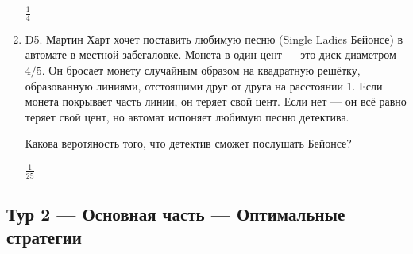 \documentclass[12pt]{article}
\newenvironment{problem}{}{}
\newenvironment{sol}{}{} %
\begin{document}
\begin{enumerate}
\begin{problem}
\begin{sol}
$\frac{1}{4}$
\end{sol}
\end{problem}

\begin{problem}
\item[D5.] Мартин Харт хочет поставить любимую песню (Single Ladies Бейонсе) в автомате в местной забегаловке. Монета в один цент — это диск диаметром $4/5$. Он бросает монету случайным образом на квадратную решётку, образованную линиями, отстоящими друг от друга на расстоянии 1. Если монета покрывает часть линии, он теряет свой цент. Если нет — он всё равно теряет свой цент, но автомат испоняет любимую песню детектива.

Какова веротяность того, что детектив сможет послушать Бейонсе?

\begin{sol}
$\frac{1}{25}$
\end{sol}
\end{problem}




\end{enumerate}


\newpage
\subsection{Тур 2 — Основная часть — Оптимальные стратегии}
\end{document}
